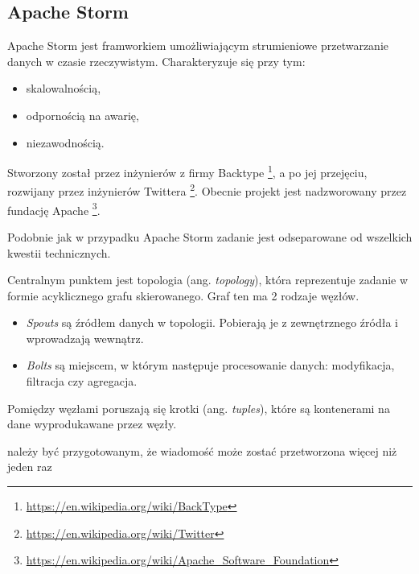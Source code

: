 \subsection{Apache Storm}
Apache Storm jest framworkiem umożliwiającym strumieniowe przetwarzanie danych w czasie rzeczywistym.
Charakteryzuje się przy tym:
\begin{itemize}
  \item skalowalnością,
  \item odpornością na awarię,
  \item niezawodnością.
\end{itemize}
Stworzony został przez inżynierów z firmy
Backtype \footnote{\url{https://en.wikipedia.org/wiki/BackType}},
a po jej przejęciu, rozwijany przez inżynierów Twittera \footnote{\url{https://en.wikipedia.org/wiki/Twitter}}.
Obecnie projekt jest nadzworowany przez fundację Apache \footnote{\url{https://en.wikipedia.org/wiki/Apache_Software_Foundation}}.

Podobnie jak w przypadku Apache Storm zadanie jest odseparowane od wszelkich kwestii technicznych.

Centralnym punktem jest topologia (ang. \textit{topology}),
która reprezentuje zadanie w formie acyklicznego grafu skierowanego.
Graf ten ma 2 rodzaje węzłów.
\begin{itemize}
  \item \textit{Spouts} są źródłem danych w topologii.
  Pobierają je z zewnętrznego źródła i wprowadzają wewnątrz.
  \item \textit{Bolts} są miejscem,
  w którym następuje procesowanie danych: modyfikacja, filtracja czy agregacja.
\end{itemize}
Pomiędzy węzłami poruszają się krotki (ang. \textit{tuples}),
które są kontenerami na dane wyprodukawane przez węzły.

należy być przygotowanym,
że wiadomość może zostać przetworzona więcej niż jeden raz
